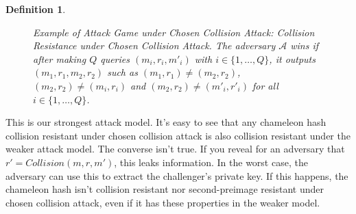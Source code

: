 \documentclass[a4paper]{article}
\newtheorem{definicao}{Definition}
\begin{document}
\begin{definicao}
     \begin{figure}
     \label{fig:chosencol}
 \centering
 \caption{Example of Attack Game under Chosen Collision Attack: Collision Resistance under Chosen Collision Attack. The adversary $\mathcal{A}$ wins if after making $Q$ queries $(m_i, r_i, m'_i)$ with $i \in \{1, \ldots, Q\}$, it outputs $(m_1, r_1, m_2, r_2)$ such as $(m_1, r_1)\neq(m_2, r_2)$, $(m_2, r_2)\neq(m_i, r_i)$ and $(m_2, r_2)\neq(m'_i, r'_i)$ for all $i \in \{1, \ldots, Q\}$.}
 \end{figure}
 \end{definicao}
 
 This is our strongest attack model. It's easy to see that any chameleon hash collision resistant under chosen collision attack is also collision resistant under the weaker attack model. The converse isn't true. If you reveal for an adversary that $r'=Collision(m, r, m')$, this leaks information. In the worst case, the adversary can use this to extract the challenger's private key. If this happens, the chameleon hash isn't collision resistant nor second-preimage resistant under chosen collision attack, even if it has these properties in the weaker model.
 
\end{document}
